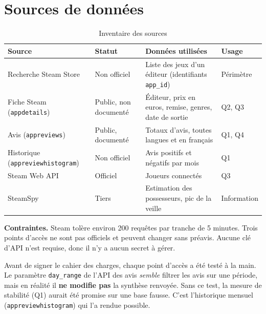 \documentclass[11pt, a4paper, oneside, headings=normal, numbers=noenddot, DIV=12]{scrartcl}
\begin{document}
\section{Sources de données}

\begin{table}[H]
\centering\small
\begin{tabularx}{\linewidth}{@{}L{3.8cm} L{2.0cm} Y L{1.9cm}@{}}
\toprule
\textbf{Source} & \textbf{Statut} & \textbf{Données utilisées} & \textbf{Usage} \\
\midrule
Recherche Steam Store & Non officiel & Liste des jeux d'un éditeur (identifiants \texttt{app\_id}) & Périmètre \\
Fiche Steam (\texttt{appdetails}) & Public, non documenté & Éditeur, prix en euros, remise, genres, date de sortie & Q2, Q3 \\
Avis (\texttt{appreviews}) & Public, documenté & Totaux d'avis, toutes langues et en français & Q1, Q4 \\
Historique (\texttt{appreviewhistogram}) & Non officiel & Avis positifs et négatifs par mois & Q1 \\
Steam Web API & Officiel & Joueurs connectés & Q3 \\
SteamSpy & Tiers & Estimation des possesseurs, pic de la veille & Information \\
\bottomrule
\end{tabularx}
\caption{Inventaire des sources}
\end{table}

\textbf{Contraintes.} Steam tolère environ 200 requêtes par tranche de 5 minutes. Trois points d'accès ne sont pas officiels et peuvent
changer sans préavis. Aucune clé d'API n'est requise, donc il n'y a aucun secret à gérer.

\begin{keybox}
Avant de signer le cahier des charges, chaque point d'accès a été testé à la main. Le paramètre \texttt{day\_range} de l'API des avis
\emph{semble} filtrer les avis sur une période, mais en réalité il \textbf{ne modifie pas} la synthèse renvoyée. Sans ce test, la mesure
de stabilité (Q1) aurait été promise sur une base fausse. C'est l'historique mensuel (\texttt{appreviewhistogram}) qui l'a rendue possible.
\end{keybox}

\end{document}
